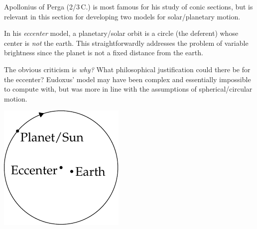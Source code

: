 \begin{minipage}[t]{0.74\linewidth}\vspace{0pt}
	 Apollonius of Perga (2\nd/3\rd{}\,C.\BC) is most famous for his study of conic sections, but is relevant in this section for developing two models for solar/planetary motion.\smallbreak
	
	In his \emph{eccenter} model, a planetary/solar orbit is a circle (the deferent) whose center is \emph{not} the earth. This straightforwardly addresses the problem of variable brightness since the planet is not a fixed distance from the earth.\smallbreak
	
	The obvious criticism is \emph{why?} What philosophical justification could there be for the eccenter? Eudoxus' model may have been complex and essentially impossible to compute with, but was more in line with the assumptions of spherical/circular motion.
\end{minipage}
\hfill
\begin{minipage}[t]{0.25\linewidth}\vspace{0pt}
  \flushright\includegraphics[scale=0.95]{trig-deferent}\phantom{b}
\end{minipage}
\medbreak
  

